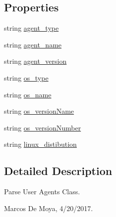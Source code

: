 \subsection*{Properties}
\begin{DoxyCompactItemize}
\item 
string \hyperlink{class_p_http_1_1_user_agent_helper_a32668b61aea7b3c394d23ac3ee81acf6}{agent\+\_\+type}
\item 
string \hyperlink{class_p_http_1_1_user_agent_helper_ac81df7ecdbf3ae16df625938c7eaf779}{agent\+\_\+name}
\item 
string \hyperlink{class_p_http_1_1_user_agent_helper_a0f135ec96700d7d78250437f10698aef}{agent\+\_\+version}
\item 
string \hyperlink{class_p_http_1_1_user_agent_helper_a56bdd55fe4db54819f70b4fb49cad6a3}{os\+\_\+type}
\item 
string \hyperlink{class_p_http_1_1_user_agent_helper_ab5559296212e60a7d019c28de04bd1f8}{os\+\_\+name}
\item 
string \hyperlink{class_p_http_1_1_user_agent_helper_a85ef5c91df4e443b201cb77965eec98f}{os\+\_\+version\+Name}
\item 
string \hyperlink{class_p_http_1_1_user_agent_helper_a918f1d0df9b9c697583f3e2d7ef52dea}{os\+\_\+version\+Number}
\item 
string \hyperlink{class_p_http_1_1_user_agent_helper_ad20c568e4a2315a703ea5f380d5422c1}{linux\+\_\+distibution}
\end{DoxyCompactItemize}


\subsection{Detailed Description}
Parse User Agents Class. 

Marcos De Moya, 4/20/2017. 

